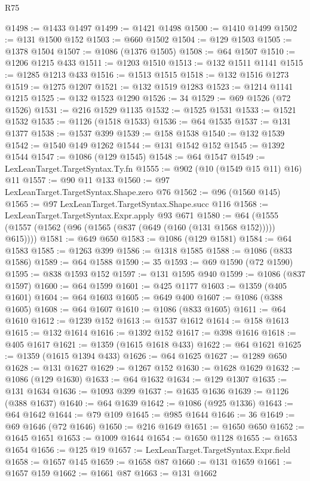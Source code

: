 \begin{lexlean}{R75}
\begin{coremodule}
@1498 := @1433 @1497
@1499 := @1421 @1498
@1500 := @1410 @1499
@1502 := @131 @1500 @152
@1503 := @660 @1502
@1504 := @129 @1503
@1505 := @1378 @1504
@1507 := @1086 (@1376 @1505)
@1508 := @64 @1507
@1510 := @1206 @1215 @433
@1511 := @1203 @1510
@1513 := @132 @1511 @1141
@1515 := @1285 @1213 @433
@1516 := @1513 @1515
@1518 := @132 @1516 @1273
@1519 := @1275 @1207
@1521 := @132 @1519 @1283
@1523 := @1214 @1141 @1215
@1525 := @132 @1523 @1290
@1526 := 34
@1529 := @69 @1526 (@72 @1526)
@1531 := @216 @1529 @1135
@1532 := @1525 @1531
@1533 := @1521 @1532
@1535 := @1126 (@1518 @1533)
@1536 := @64 @1535
@1537 := @131 @1377
@1538 := @1537 @399
@1539 := @158 @1538
@1540 := @132 @1539
@1542 := @1540 @149 @1262
@1544 := @131 @1542 @152
@1545 := @1392 @1544
@1547 := @1086 (@129 @1545)
@1548 := @64 @1547
@1549 := LexLeanTarget.TargetSyntax.Ty.fn
@1555 := @902 (@10 (@1549 @15 @11) @16) @11
@1557 := @90 @11 @133
@1560 := @97 LexLeanTarget.TargetSyntax.Shape.zero @76
@1562 := @96 (@1560 @145)
@1565 := @97 LexLeanTarget.TargetSyntax.Shape.succ @116
@1568 := LexLeanTarget.TargetSyntax.Expr.apply @93 @671
@1580 := @64 (@1555 (@1557 (@1562 (@96 (@1565 (@837 (@649 (@160 (@131 @1568 @152))))) @615))))
@1581 := @649 @650
@1583 := @1086 (@129 @1581)
@1584 := @64 @1583
@1585 := @1263 @399
@1586 := @1318 @1585
@1588 := @1086 (@833 @1586)
@1589 := @64 @1588
@1590 := 35
@1593 := @69 @1590 (@72 @1590)
@1595 := @838 @1593 @152
@1597 := @131 @1595 @940
@1599 := @1086 (@837 @1597)
@1600 := @64 @1599
@1601 := @425 @1177
@1603 := @1359 (@405 @1601)
@1604 := @64 @1603
@1605 := @649 @400
@1607 := @1086 (@388 @1605)
@1608 := @64 @1607
@1610 := @1086 (@833 @1605)
@1611 := @64 @1610
@1612 := @1239 @152
@1613 := @1537 @1612
@1614 := @158 @1613
@1615 := @132 @1614
@1616 := @1392 @152
@1617 := @398 @1616
@1618 := @405 @1617
@1621 := @1359 (@1615 @1618 @433)
@1622 := @64 @1621
@1625 := @1359 (@1615 @1394 @433)
@1626 := @64 @1625
@1627 := @1289 @650
@1628 := @131 @1627
@1629 := @1267 @152
@1630 := @1628 @1629
@1632 := @1086 (@129 @1630)
@1633 := @64 @1632
@1634 := @129 @1307
@1635 := @131 @1634
@1636 := @1093 @399
@1637 := @1635 @1636
@1639 := @1126 (@388 @1637)
@1640 := @64 @1639
@1642 := @1086 (@925 @1336)
@1643 := @64 @1642
@1644 := @79 @109
@1645 := @985 @1644
@1646 := 36
@1649 := @69 @1646 (@72 @1646)
@1650 := @216 @1649
@1651 := @1650 @650
@1652 := @1645 @1651
@1653 := @1009 @1644
@1654 := @1650 @1128
@1655 := @1653 @1654
@1656 := @125 @19
@1657 := LexLeanTarget.TargetSyntax.Expr.field
@1658 := @1657 @145
@1659 := @1658 @87
@1660 := @131 @1659
@1661 := @1657 @159
@1662 := @1661 @87
@1663 := @131 @1662

\end{coremodule}
\end{lexlean}
